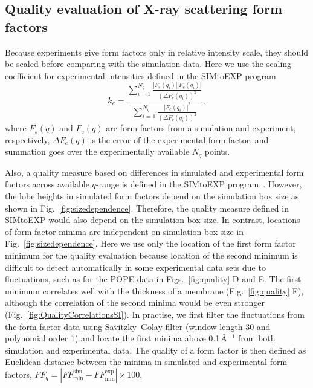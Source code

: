 \documentclass[fleqn,10pt]{wlscirep}
\begin{document}
\subsection{Quality evaluation of X-ray scattering form factors}
Because experiments give form factors only in relative intensity scale, they should be scaled before comparing with the simulation data. Here we use the scaling coefficient for experimental intensities defined in the SIMtoEXP program~\cite{kucerka10}
\begin{equation}
    k_e = \frac{\sum_{i=1}^{N_q} \frac{|F_s(q_i)||F_e(q_i)|}{(\Delta F_e(q_i))^2}}{\sum_{i=1}^{N_q} \frac{|F_e(q_i)|^2}{(\Delta F_e(q_i))^2}},
\end{equation}
where $F_s(q)$ and $F_e(q)$ are form factors from a simulation and experiment, respectively, $\Delta F_e(q)$ is the error of the experimental form factor, and summation goes over the experimentally available $N_q$ points. 

Also, a quality measure based on differences in simulated and experimental form factors across available $q$-range is defined in the SIMtoEXP program~\cite{kucerka10}. However, the lobe heights in simulated form factors depend on the simulation box size as shown in Fig.~\ref{fig:sizedependence}. Therefore, the quality measure defined in SIMtoEXP  would also depend on the simulation box size. In contrast, locations of form factor minima are independent on simulation box size in Fig.~\ref{fig:sizedependence}. Here we use only the location of the first form factor minimum for the quality evaluation because location of the second minimum is difficult to detect automatically in some experimental data sets due to fluctuations, such as for the POPE data in Figs.~\ref{fig:quality} D and E. The first minimum correlates well with the thickness of a membrane (Fig.~\ref{fig:quality} F), although the correlation of the second minima would be even stronger (Fig.~\ref{fig:QualityCorrelationsSI}). In practise, we first filter the fluctuations from the form factor data using Savitzky--Golay filter (window length 30 and polynomial order 1) and locate the first minima above 0.1\,\AA$^{-1}$ from both simulation and experimental data. The quality of a form factor is then defined as Euclidean distance between the minima in simulated and experimental form factors, $FF_q = |FF_\mathrm{min}^\mathrm{sim}-FF_\mathrm{min}^\mathrm{exp}| \times 100$. 
\end{document}
